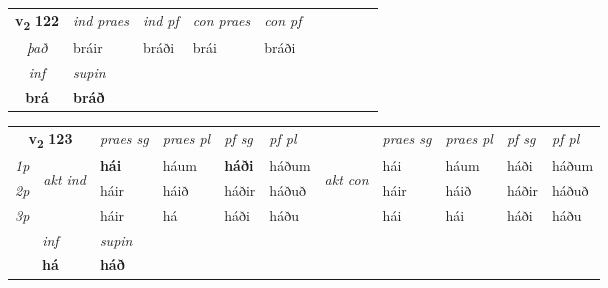 \noindent
\begin{tabular}{lllllllllll} \toprule
\multicolumn{2}{c}{\textbf{v{\textsubscript{2}}} \Large{\textbf{122}}}  &  \textit{ind praes} & \textit{ind pf} & \textit{con praes} & \textit{con pf} \\*
\multicolumn{2}{c}{ \textit{það} } & bráir & bráði & brái & bráði \\*

\cmidrule{3-3}
   \multicolumn{2}{c}{\textit{inf}}      & \textit{supin}   \\*
  \multicolumn{2}{c}{\textbf{brá}}       &  \textbf{bráð}   \\*
\end{tabular}

\noindent
\begin{tabular}{lllllllllll} \toprule
\multicolumn{2}{c}{\textbf{v{\textsubscript{2}}} \Large{\textbf{123}}}  &  \textit{praes sg}  & \textit{praes pl}  &\textit{ pf sg} & \textit{pf pl} &  &  \textit{praes sg}  & \textit{praes pl}  & \textit{pf sg} & \textit{pf pl } \\*
	\cmidrule{3-6} \cmidrule{8-11}
 {\textit{1p}} & \multirow{3}{*}{\begin{turn}{90}\textit{akt ind}\end{turn}} & \textbf{hái} & háum & \textbf{háði} & háðum & \multirow{3}{*}{\begin{turn}{90}\textit{akt con}\end{turn}} &hái & háum & háði & háðum\\*
 {\textit{2p}} &  &  háir  & háið & háðir & háðuð & & háir & háið & háðir & háðuð \\*
{\textit{3p}} &  & háir & há & háði & háðu & & hái & hái& háði & háðu \\*
\cmidrule{3-6} \cmidrule{8-11}

   \multicolumn{2}{c}{\textit{inf}}      & \textit{supin}   \\*
  \multicolumn{2}{c}{\textbf{há}}       &  \textbf{háð}   \\*
\end{tabular}

